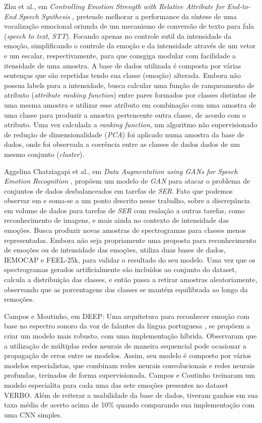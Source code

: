 Zhu et al., em\textit{ Controlling Emotion Strength with Relative Attribute for End-to-End Speech Synthesis} \cite{63}, pretende melhorar a performance da síntese de uma vocalização emocional oriunda de um mecanismo de conversão de texto para fala (\textit{speech to text}, \textit{STT}). Focando apenas no controle sutil da intensidade da emoção, simplificando o controle da emoção e da intensidade através de um vetor e um escalar, respectivamente, para que consgiga modular com facilidade a itensidade de uma amostra. A base de dados utilizada é composta por várias sentenças que são repetidas tendo sua classe (emoção) alterada. Embora não possua labels para a intensidade, \cite{63} busca calcular uma função de ranqueamento de atributo (\textit{attribute ranking function}) entre pares formados por classes distintas de uma mesma amostra e utilizar esse atributo em combinação com uma amostra de uma classe para produzir a amostra pertencente outra classe, de acordo com o atributo. Uma vez calculada a \textit{ranking function}, um algoritmo não supervisionado de redução de dimensionalidade (\textit{PCA}) foi aplicado numa amostra da base de dados, onde foi observada a coerência entre as classes de dados dados de um mesmo conjunto (\textit{cluster}).

Aggelina Chatziagapi et al., em \textit{Data Augmentation using GANs for Speech Emotion Recognition }\cite{32.89}, propõem um modelo de \textit{GAN} para atacar o problema de conjuntos de dados desbalanceados em tarefas de \textit{SER}. Fato que podemos observar em \cite{32.32} e soma-se a um ponto descrito nesse trabalho, sobre a discrepância em volume de dados para tarefas de \textit{SER} com realação a outras tarefas, como reconhecimento de imagens, e mais ainda no contexto de intensidade das emoções. Busca produzir novas amostras de spectrogramas para classes menos representadas. Embora não seja propriamente uma proposta para reconhecimento de emoções ou de intensidade das emoções, \cite{32.89} utiliza duas bases de dados, IEMOCAP e FEEL-25k, para validar o resultado do seu modelo. Uma vez que os spectrogramas gerados artificialmente são incluídos ao conjunto do dataset, calcula a distribuição das classes, e então passa a retirar amostras aleatoriamente, observando que as porcentagens das classes se mantém equilibrada ao longo da remoções.

Campos e Moutinho, em DEEP: Uma arquitetura para reconhecer emoção com base no espectro sonoro da voz de falantes da língua portuguesa \cite{12}, se propõem a criar um modelo mais robusto, com uma implementação híbrida. Observaram que a utilização de múltiplas redes neurais de maneira sequencial pode ocasionar a propagação de erros entre os modelos. Assim, seu modelo é composto por vários modelos especialistas, que combinam redes neurais convolucionais e redes neurais profundas, treinados de forma supervisionada. Campos e Coutinho treinaram um modelo especialita para cada uma das sete emoções presentes no dataset VERBO. Além de reiterar a usabilidade da base de dados, tiveram ganhos em sua taxa média de acerto acima de 10\% quando comparando sua implementação com uma CNN simples.

